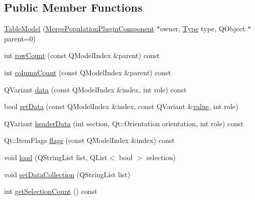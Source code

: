 \subsection*{Public Member Functions}
\begin{DoxyCompactItemize}
\item 
\mbox{\hyperlink{class_merge_population_plugin_component_1_1_table_model_af54523426b049f4749c4bb6aab0a38d4}{Table\+Model}} (\mbox{\hyperlink{class_merge_population_plugin_component}{Merge\+Population\+Plugin\+Component}} $\ast$owner, \mbox{\hyperlink{class_merge_population_plugin_component_1_1_table_model_aedcae9b9dcacd928610323861dcb1258}{Type}} type, Q\+Object $\ast$parent=0)
\item 
int \mbox{\hyperlink{class_merge_population_plugin_component_1_1_table_model_aeb55e818c622767750ff0a51e34c69e1}{row\+Count}} (const Q\+Model\+Index \&parent) const
\item 
int \mbox{\hyperlink{class_merge_population_plugin_component_1_1_table_model_a0b54558494c9992d90e0f5178a632a88}{column\+Count}} (const Q\+Model\+Index \&parent) const
\item 
Q\+Variant \mbox{\hyperlink{class_merge_population_plugin_component_1_1_table_model_a6e33ec16c60aa70c6a43a93d79cff618}{data}} (const Q\+Model\+Index \&index, int role) const
\item 
bool \mbox{\hyperlink{class_merge_population_plugin_component_1_1_table_model_aae3a1ec7b80e1dbb5131b610991fbbac}{set\+Data}} (const Q\+Model\+Index \&index, const Q\+Variant \&\mbox{\hyperlink{diffusion_8cpp_a4b41795815d9f3d03abfc739e666d5da}{value}}, int role)
\item 
Q\+Variant \mbox{\hyperlink{class_merge_population_plugin_component_1_1_table_model_a8272b6910df0ece9c18a9c62c47fac84}{header\+Data}} (int section, Qt\+::\+Orientation orientation, int role) const
\item 
Qt\+::\+Item\+Flags \mbox{\hyperlink{class_merge_population_plugin_component_1_1_table_model_a66ad29a0328e86269f45d045ef4a3c96}{flags}} (const Q\+Model\+Index \&index) const
\item 
void \mbox{\hyperlink{class_merge_population_plugin_component_1_1_table_model_af569b191caa1de7d87c6783fee0eb618}{load}} (Q\+String\+List list, Q\+List$<$ bool $>$ selection)
\item 
void \mbox{\hyperlink{class_merge_population_plugin_component_1_1_table_model_a70a803baa9ffe0815e5ec46254a599cf}{set\+Data\+Collection}} (Q\+String\+List list)
\item 
int \mbox{\hyperlink{class_merge_population_plugin_component_1_1_table_model_aeea735796f55d2588af88d50cd536c67}{get\+Selection\+Count}} () const

\end{DoxyCompactItemize}

